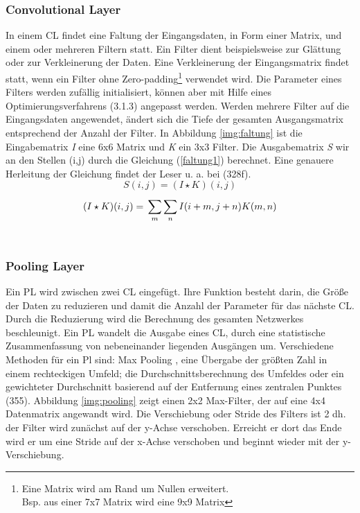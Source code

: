 \documentclass[twosided,a4,10pt]{article}
\begin{document}
\begin{multicols}{2}
		\subsubsection*{Convolutional Layer}
		In einem CL findet eine Faltung der Eingangsdaten, in Form einer Matrix, und einem oder mehreren Filtern statt. Ein Filter dient beispielsweise zur Glättung oder zur Verkleinerung der Daten. Eine Verkleinerung der Eingangsmatrix findet statt, wenn ein Filter ohne Zero-padding\footnote[6]{Eine Matrix wird am Rand um Nullen erweitert.\\ Bsp. aus einer 7x7 Matrix wird eine 9x9 Matrix} verwendet wird. Die Parameter eines Filters werden zufällig initialisiert, können aber mit Hilfe eines Optimierungsverfahrens (3.1.3) angepasst werden. Werden mehrere Filter auf die Eingangsdaten angewendet, ändert sich die Tiefe der gesamten Ausgangsmatrix entsprechend der Anzahl der Filter. \cite{karpathy}\newline
		In Abbildung \ref{img:faltung} ist die Eingabematrix \textit{I} eine 6x6 Matrix und \textit{K} ein 3x3 Filter. Die Ausgabematrix \textit{S} wir an den Stellen (i,j) durch die Gleichung (\ref{faltung1}) berechnet. Eine genauere Herleitung der Gleichung findet der Leser u. a. bei \cite{goodfellow}(328f).
		\begin{equation}\label{faltung1}
		S(i,j) =(I \star K)(i,j)
		\end{equation}
		\begin{equation}\label{faltung2}
		(I \star K)(i,j) =\newline\sum_{m}^{}\sum_{n}^{}I(i+m,j+n)K(m,n)
		\end{equation}\newline\\
		
		\subsubsection*{Pooling Layer}
		Ein PL wird zwischen zwei CL eingefügt. Ihre Funktion besteht darin, die Größe der Daten zu reduzieren und damit die Anzahl der Parameter für das nächste CL. Durch die Reduzierung wird die Berechnung des gesamten Netzwerkes beschleunigt. \cite{karpathy}\newline Ein PL wandelt die Ausgabe eines CL, durch eine statistische Zusammenfassung von nebeneinander liegenden Ausgängen um. Verschiedene Methoden für ein Pl sind: Max Pooling \cite{zhou}, eine Übergabe der größten Zahl in einem rechteckigen Umfeld; die Durchschnittsberechnung des Umfeldes oder ein gewichteter Durchschnitt basierend auf der Entfernung eines zentralen Punktes \cite{goodfellow}(355).\newline
		Abbildung \ref{img:pooling} zeigt einen 2x2 Max-Filter, der auf eine 4x4 Datenmatrix angewandt wird. Die Verschiebung oder Stride des Filters ist 2 dh. der Filter wird zunächst auf der y-Achse verschoben. Erreicht er dort das Ende wird er um eine Stride auf der x-Achse verschoben und beginnt wieder mit der y-Verschiebung.\newline\\
		

\end{multicols}
\end{document}
